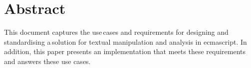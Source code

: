 
\begingroup
\let\clearpage\relax
\let\cleardoublepage\relax
\let\cleardoublepage\relax

\chapter*{Abstract}

This document captures the use\,cases and requirements for designing and
standardising a\,solution for textual manipulation and analysis in
\gls{ecmascript}. In addition, this paper presents an implementation that
meets these requirements and answers these use cases.

\endgroup

